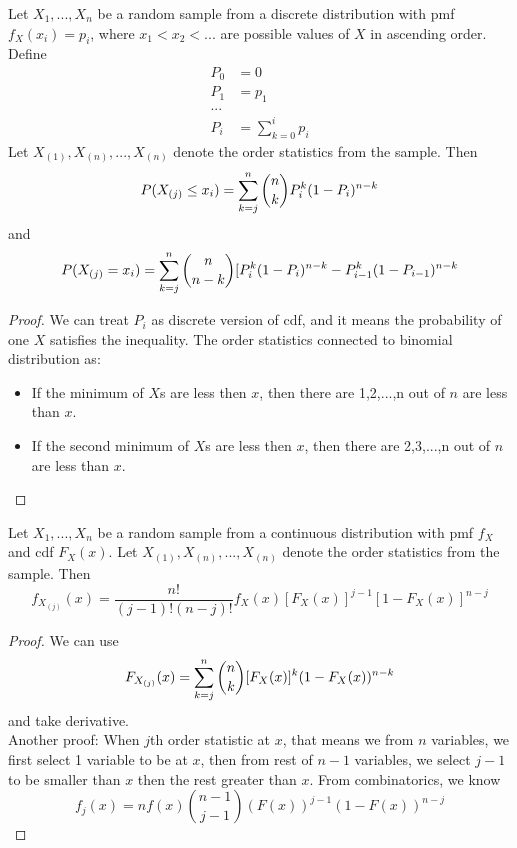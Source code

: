 \begin{refsection}
\begin{theorem}\cite{casella2002statistical}
 Let $X_1,...,X_n$ be a random sample from a discrete distribution with pmf $f_X(x_i)=p_i$, where $x_1 < x_2 <...$ are possible values of $X$ in ascending order. Define
\begin{align*}
    P_0 &=0\\
    P_1 &=p_1\\
    ... & \\
    P_i &= \sum_{k=0}^i p_i
\end{align*}
Let $X_{(1)},X_{(n)},...,X_{(n)}$ denote the order statistics from the sample. Then
\begin{equation}
P(X_{(j)} \leq x_i) = \sum_{k=j}^n \dbinom{n}{k} P_i^k (1-P_i)^{n-k} 
\end{equation}
and
\begin{equation}
 P(X_{(j)} = x_i) = \sum_{k=j}^n \dbinom{n}{n-k} [P_i^k (1-P_i)^{n-k} - P^k_{i-1}(1-P_{i-1})^{n-k}
\end{equation}
\end{theorem}
\begin{proof}
 We can treat $P_i$ as discrete version of cdf, and it means the probability of one $X$ satisfies the inequality. The order statistics connected to binomial distribution as:
 \begin{itemize}
 	\item If the minimum of $X$s are less then $x$, then there are 1,2,...,n out of $n$ are less than $x$.
 	\item If the second minimum of $X$s are less then $x$, then  there are 2,3,...,n out of $n$ are less than $x$.
 \end{itemize}
\end{proof}



\begin{theorem}\cite{casella2002statistical} Let $X_1,...,X_n$ be a random sample from a continuous distribution with pmf $f_X$ and cdf $F_X(x)$. 
Let $X_{(1)},X_{(n)},...,X_{(n)}$ denote the order statistics from the sample. Then 
$$f_{X_{(j)}} (x) = \frac{n!}{(j-1)!(n-j)!}f_X(x) [F_X(x)]^{j-1}[1-F_X(x)]^{n-j}$$
\end{theorem}
\begin{proof}
 We can use 
$$F_{X_{(j)}}(x) = \sum_{k=j}^n \dbinom{n}{k} [F_X(x)]^k (1-F_X(x))^{n-k}$$ and take derivative. \\
Another proof:
When $j$th order statistic at $x$, that means we from $n$ variables, we first select 1 variable to be at $x$, then from rest of $n-1$ variables, we select $j-1$ to be smaller than $x$ then the rest greater than $x$. From combinatorics, we know
$$f_j(x) = n f(x) \binom{n-1}{j-1}(F(x))^{j-1}(1-F(x))^{n-j}$$ 
\end{proof}


\end{refsection}
